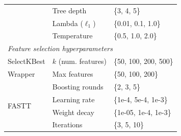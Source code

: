 \begin{table}[t]
\begin{tabular}{@{}lll@{}}
                                                                               & Tree depth          & \{3, 4, 5\}                \\
                                                                               & Lambda ($\ell_{1}$) & \{0.01, 0.1, 1.0\}         \\
                                                                               & Temperature         & \{0.5, 1.0, 2.0\}          \\
        \midrule \multicolumn{3}{l}{\textit{Feature selection hyperparameters}} \\
        \midrule SelectKBest                                                   & $k$ (num. features) & \{50, 100, 200, 500\}      \\
        \midrule Wrapper                                                       & Max features        & \{50, 100, 200\}           \\
        \midrule \multirow{4}{*}{FASTT}                                        & Boosting rounds     & \{2, 3, 5\}                \\
                                                                               & Learning rate       & \{1e-4, 5e-4, 1e-3\}       \\
                                                                               & Weight decay        & \{1e-05, 1e-4, 1e-3\}      \\
                                                                               & Iterations          & \{3, 5, 10\}               \\
        \bottomrule
    \end{tabular}
\end{table}